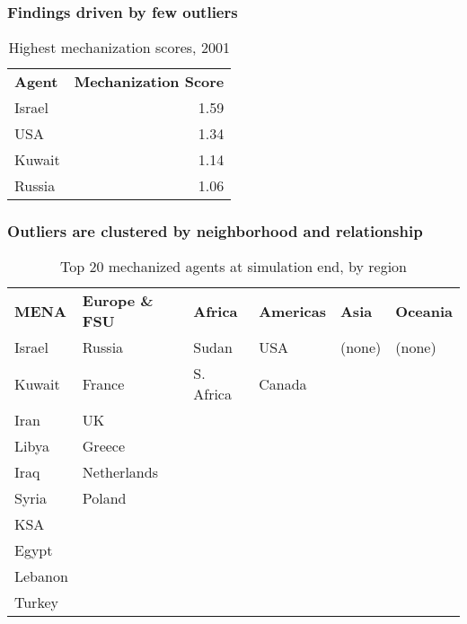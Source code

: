 \documentclass{beamer}
\begin{document}
\begin{frame}
	\frametitle{Findings driven by few outliers}
	\begin{table}[h]
		\centering
		\caption{Highest mechanization scores, 2001}
		\begin{tabular}{|l r|}
			\hline
			\textbf{Agent} & \textbf{Mechanization Score} \\
			Israel & 1.59 \\
			USA & 1.34 \\
			Kuwait & 1.14 \\
			Russia & 1.06 \\
			\hline
		\end{tabular}
	\end{table}
\end{frame}

\begin{frame}
	\frametitle{Outliers are clustered by neighborhood and relationship}
	\begin{table}[h]
		\centering
		\caption{Top 20 mechanized agents at simulation end, by region}
		\begin{tabular}{|l l l l l l|}
			\hline
			\textbf{MENA} & \textbf{Europe \& FSU} & \textbf{Africa} & \textbf{Americas} & \textbf{Asia} & \textbf{Oceania} \\
			Israel       & Russia         & Sudan        & USA    & (none) & (none) \\
			Kuwait       & France         & S. Africa    & Canada &        &        \\
			Iran         & UK             &              &        &        &        \\
			Libya        & Greece         &              &        &        &        \\
			Iraq         & Netherlands    &              &        &        &        \\
			Syria        & Poland         &              &        &        &        \\
			KSA          &                &              &        &        &        \\
			Egypt        &                &              &        &        &        \\
			Lebanon      &                &              &        &        &        \\
			Turkey       &                &              &        &        &        \\
			\hline
		\end{tabular}
	\end{table}
\end{frame}
\end{document}
